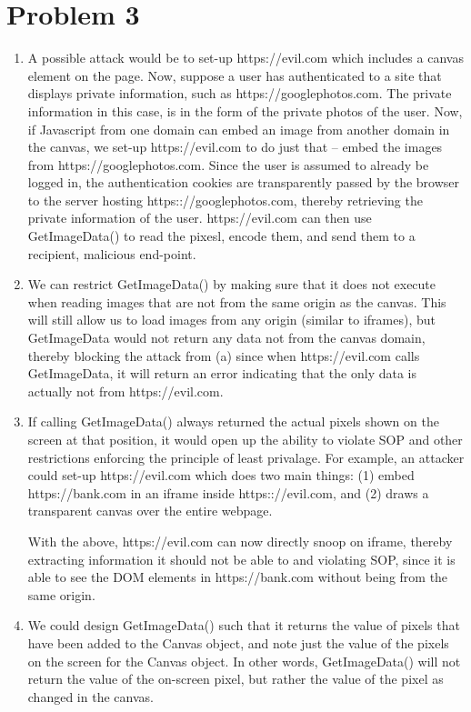 \documentclass[12pt]{article}
\begin{document}
\pagebreak
\section*{Problem 3}
\begin{enumerate}[label=(\alph*)]
\item A possible attack would be to set-up https://evil.com which includes a canvas element on the page. Now, suppose a user has authenticated to a site that displays private information, such as https://googlephotos.com. The private information in this case, is in the form of the private photos of the user. Now, if Javascript from one domain can embed an image from another domain in the canvas, we set-up https://evil.com to do just that -- embed the images from https://googlephotos.com. Since the user is assumed to already be logged in, the authentication cookies are transparently passed by the browser to the server hosting https:://googlephotos.com, thereby retrieving the private information of the user. https://evil.com can then use GetImageData() to read the pixesl, encode them, and send them to a recipient, malicious end-point.
\item We can restrict GetImageData() by making sure that it does not execute when reading images that are not from the same origin as the canvas. This will still allow us to load images from any origin (similar to iframes), but GetImageData would not return any data not from the canvas domain, thereby blocking the attack from (a) since when https://evil.com calls GetImageData, it will return an error indicating that the only data is actually not from https://evil.com.
\item  If calling GetImageData() always returned the actual pixels shown on the screen at that position, it would open up the ability to violate SOP and other restrictions enforcing the principle of least privalage. For example, an attacker could set-up https://evil.com which does two main things: (1) embed https://bank.com in an iframe inside https:://evil.com, and (2) draws a transparent canvas over the entire webpage.

With the above, https://evil.com can now directly snoop on iframe, thereby extracting information it should not be able to and violating SOP, since it is able to see the DOM elements in https://bank.com without being from the same origin.
\item We could design GetImageData() such that it returns the value of pixels that have been added to the Canvas object, and note just the value of the pixels on the screen for the Canvas object. In other words, GetImageData() will not return the value of the on-screen pixel, but rather the value of the pixel as changed in the canvas.
\end{enumerate}
\end{document}
